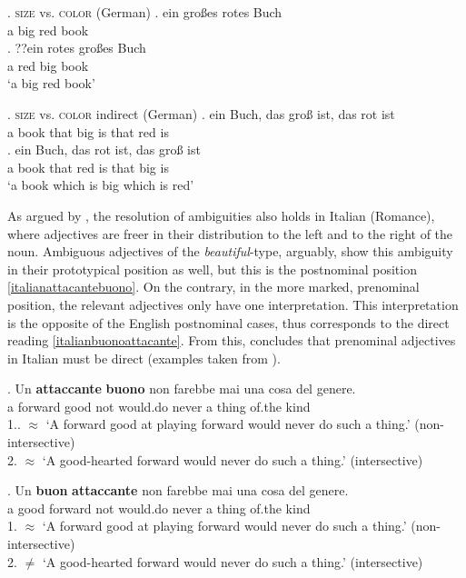 \ex. \label{bigredgerman} \textsc{size} vs. \textsc{color} (German)
\ag. ein großes rotes Buch\\
a big red book\\
\bg. ??ein rotes großes Buch\\
a red big book\\
`a big red book’

\ex. \label{bigredrcgerman} \textsc{size} vs. \textsc{color} indirect (German)
\ag. ein Buch, das groß ist, das rot ist\\
a book that big is that red is\\
\bg. ein Buch, das rot ist, das groß ist\\
a book that red is that big is\\
`a book which is big which is red’

As argued by \citet{cinque:2010:adj}, the resolution of ambiguities also holds in  Italian (Romance), where adjectives are freer in their distribution to the left and to the right of the noun. Ambiguous adjectives of the \textit{beautiful}-type, arguably, show this ambiguity in their prototypical position as well, but this is the postnominal position \ref{italianattacantebuono}. On the contrary, in the more marked, prenominal position, the relevant adjectives only have one interpretation. This interpretation is the opposite of the English postnominal cases, thus corresponds to the direct reading \ref{italianbuonoattacante}. From this, \citet[§ 2.4]{cinque:2010:adj} concludes that prenominal adjectives in Italian must be direct  (examples taken from \citealt[10]{cinque:2010:adj}).

\exg. Un \textbf{attaccante} \textbf{buono} non farebbe mai una cosa del genere.\\
a forward good not would.do never a thing of.the kind\\
1.. $\approx$ `A forward good at playing forward would never do such a thing.’ (non-intersective)\\
2. $\approx$ `A good-hearted forward would never do such a thing.’ (intersective) \label{italianattacantebuono}

\exg. Un \textbf{buon} \textbf{attaccante} non farebbe mai una cosa del genere.\\
a good forward not would.do never a thing of.the kind\\
1. $\approx$ `A forward good at playing forward would never do such a thing.’ (non-intersective)\\
2. $\neq$ `A good-hearted forward would never do such a thing.’ (intersective)\label{italianbuonoattacante}


